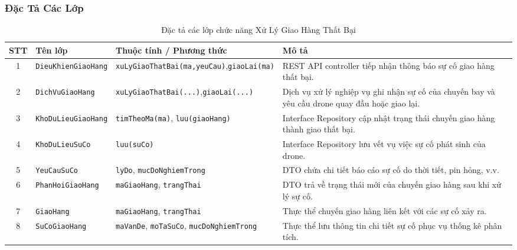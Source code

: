 \subsubsection{Đặc Tả Các Lớp}
\begin{table}[H]
  \centering
  \small
  \begin{tabularx}{\textwidth}{|c|>{\raggedright\arraybackslash}p{3.5cm}|>{\raggedright\arraybackslash}p{4.5cm}|>{\raggedright\arraybackslash}X|}
    \hline
    \textbf{STT} & \textbf{Tên lớp} & \textbf{Thuộc tính / Phương thức} & \textbf{Mô tả} \\
    \hline
    1 & \texttt{Dieu\allowbreak Khien\allowbreak Giao\allowbreak Hang} & \texttt{xu\allowbreak Ly\allowbreak Giao\allowbreak That\allowbreak Bai\allowbreak (ma,\allowbreak yeu\allowbreak Cau)},\newline \texttt{giao\allowbreak Lai\allowbreak (ma)} & REST API controller tiếp nhận thông báo sự cố giao hàng thất bại. \\ \hline
    2 & \texttt{Dich\allowbreak Vu\allowbreak Giao\allowbreak Hang} & \texttt{xu\allowbreak Ly\allowbreak Giao\allowbreak That\allowbreak Bai\allowbreak (...)},\newline \texttt{giao\allowbreak Lai\allowbreak (...)} & Dịch vụ xử lý nghiệp vụ ghi nhận sự cố của chuyến bay và yêu cầu drone quay đầu hoặc giao lại. \\ \hline
    3 & \texttt{Kho\allowbreak Du\allowbreak Lieu\allowbreak Giao\allowbreak Hang} & \texttt{tim\allowbreak Theo\allowbreak Ma\allowbreak (ma)}, \texttt{luu\allowbreak (giao\allowbreak Hang)} & Interface Repository cập nhật trạng thái chuyến giao hàng thành giao thất bại. \\ \hline
    4 & \texttt{Kho\allowbreak Du\allowbreak Lieu\allowbreak Su\allowbreak Co} & \texttt{luu\allowbreak (su\allowbreak Co)} & Interface Repository lưu vết vụ việc sự cố phát sinh của drone. \\ \hline
    5 & \texttt{Yeu\allowbreak Cau\allowbreak Su\allowbreak Co} & \texttt{ly\allowbreak Do}, \texttt{muc\allowbreak Do\allowbreak Nghiem\allowbreak Trong} & DTO chứa chi tiết báo cáo sự cố do thời tiết, pin hỏng, v.v. \\ \hline
    6 & \texttt{Phan\allowbreak Hoi\allowbreak Giao\allowbreak Hang} & \texttt{ma\allowbreak Giao\allowbreak Hang}, \texttt{trang\allowbreak Thai} & DTO trả về trạng thái mới của chuyến giao hàng sau khi xử lý sự cố. \\ \hline
    7 & \texttt{Giao\allowbreak Hang} & \texttt{ma\allowbreak Giao\allowbreak Hang}, \texttt{trang\allowbreak Thai} & Thực thể chuyến giao hàng liên kết với các sự cố xảy ra. \\ \hline
    8 & \texttt{Su\allowbreak Co\allowbreak Giao\allowbreak Hang} & \texttt{ma\allowbreak Van\allowbreak De}, \texttt{mo\allowbreak Ta\allowbreak Su\allowbreak Co}, \texttt{muc\allowbreak Do\allowbreak Nghiem\allowbreak Trong} & Thực thể lưu thông tin chi tiết sự cố phục vụ thống kê phân tích. \\
    \hline
  \end{tabularx}
  \caption{Đặc tả các lớp chức năng Xử Lý Giao Hàng Thất Bại}
  \label{tab:class-spec-uc06}
\end{table}

